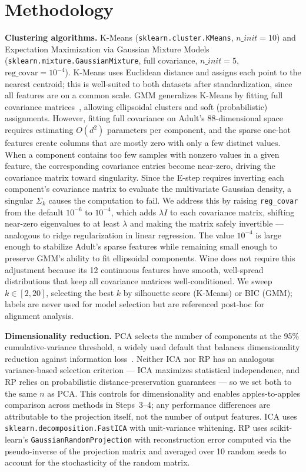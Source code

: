 \documentclass[conference]{IEEEtran}
\begin{document}
\section{Methodology}

\textbf{Clustering algorithms.} K-Means (\texttt{sklearn.cluster.KMeans},
$n\_init=10$) and Expectation Maximization via Gaussian Mixture Models
(\texttt{sklearn.mixture.GaussianMixture}, full covariance,
$n\_init=5$, $\text{reg\_covar}=10^{-4}$). K-Means uses Euclidean
distance and assigns each point to the nearest centroid; this is
well-suited to both datasets after standardization, since all features
are on a common scale. GMM generalizes K-Means by fitting full
covariance matrices~\cite{reynolds2009}, allowing ellipsoidal clusters and soft
(probabilistic) assignments. However, fitting full covariance on
Adult's 88-dimensional space requires estimating $O(d^2)$ parameters
per component, and the sparse one-hot features create columns that
are mostly zero with only a few distinct values. When a component
contains too few samples with nonzero values in a given feature, the
corresponding covariance entries become near-zero, driving the
covariance matrix toward singularity. Since the E-step requires
inverting each component's covariance matrix to evaluate the
multivariate Gaussian density, a singular $\Sigma_k$ causes the
computation to fail. We address this by raising
\texttt{reg\_covar} from the default $10^{-6}$ to $10^{-4}$, which
adds $\lambda I$ to each covariance matrix, shifting near-zero
eigenvalues to at least $\lambda$ and making the matrix safely
invertible --- analogous to ridge regularization in linear regression.
The value $10^{-4}$ is large enough to stabilize Adult's sparse
features while remaining small enough to preserve GMM's ability to
fit ellipsoidal components.
Wine does not require this adjustment because its 12 continuous
features have smooth, well-spread distributions that keep all
covariance matrices well-conditioned. We sweep $k \in [2,20]$,
selecting the best $k$ by silhouette score (K-Means) or BIC (GMM);
labels are never used for model selection but are referenced post-hoc
for alignment analysis.

\textbf{Dimensionality reduction.} PCA selects the number of components
at the 95\% cumulative-variance threshold, a widely used default that
balances dimensionality reduction against information
loss~\cite{jolliffe2002}. Neither ICA nor RP has an analogous variance-based selection
criterion --- ICA maximizes statistical independence, and RP relies on
probabilistic distance-preservation guarantees --- so we set both to
the same $n$ as PCA. This controls for dimensionality and enables
apples-to-apples comparison across methods in Steps~3--4; any
performance differences are attributable to the projection itself,
not the number of output features.
ICA uses \texttt{sklearn.decomposition.FastICA} with unit-variance
whitening. RP uses scikit-learn's \texttt{GaussianRandomProjection}
with reconstruction error computed via the pseudo-inverse of the
projection matrix and averaged over 10 random seeds to account for
the stochasticity of the random matrix.
\end{document}
